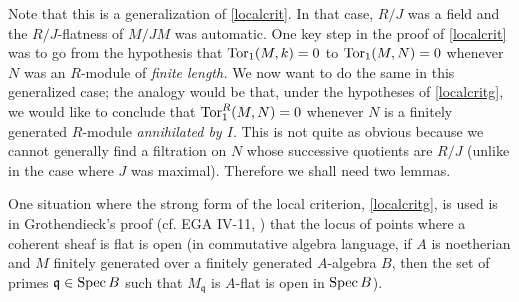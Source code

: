 Note that this is a generalization of \cref{localcrit}. In that case, $R/J$ was
a field and the $R/J$-flatness of $M/JM$ was automatic.
One key step in the proof of \cref{localcrit} was to go from the hypothesis
that $\operatorname{Tor}_1(M, k) = 0$ to $\operatorname{Tor}_1(M, N) =0 $ whenever $N$ was an $R$-module of
\emph{finite length.}
We now want to do the same in this generalized case; the analogy would be
that, under the hypotheses of \cref{localcritg}, we would like to conclude
that $\operatorname{Tor}_1^R(M, N) = 0$ whenever $N$ is a finitely generated $R$-module
\emph{annihilated by $I$}. 
This is not quite as obvious because we cannot generally find a filtration on
$N$ whose successive quotients are $R/J$ (unlike in the case where $J$ was
maximal).
Therefore we shall need two lemmas.

\begin{remark} 
One situation where the strong form of the local criterion, \cref{localcritg},
is used is in Grothendieck's proof (cf. EGA IV-11, \cite{EGA}) that the locus of points where a coherent
sheaf is flat is open (in commutative algebra language, if $A$ is noetherian
and $M$ finitely generated over a finitely generated $A$-algebra $B$, then the
set of primes $\mathfrak{q} \in \operatorname{Spec} B$ such that $M_{\mathfrak{q}}$ is
$A$-flat is open in $\operatorname{Spec}  B$).
\end{remark} 

